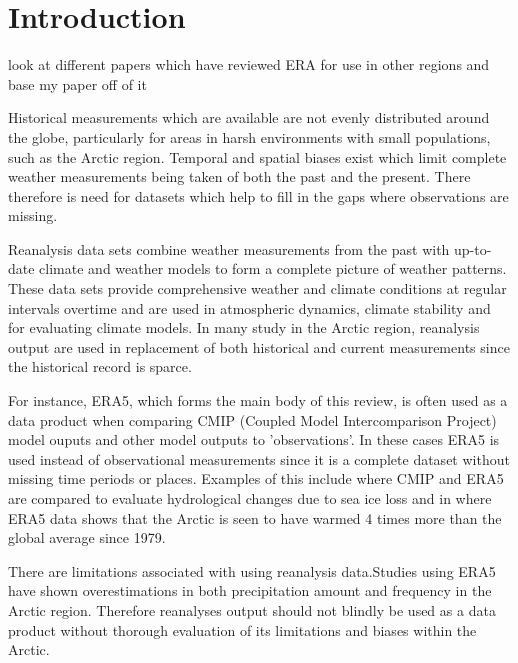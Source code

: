 \documentclass[12pt, oneside]{article}
\begin{document}
\thispagestyle{empty}
\clearpage
\setcounter{page}{1}


\pagebreak



\section{Introduction}

{\color{blue}look at different papers which have reviewed ERA for use in other regions and base my paper off of it}


Historical measurements which are available are not evenly distributed around the globe, particularly for areas in harsh environments with small populations, such as the Arctic region. Temporal and spatial biases exist which limit complete weather measurements being taken of both the past and the present. There therefore is need for datasets which help to fill in the gaps where observations are missing.

Reanalysis data sets combine weather measurements from the past with up-to-date climate and weather models to form a complete picture of weather patterns. These data sets provide comprehensive weather and climate conditions at regular intervals overtime and are used in atmospheric dynamics, climate stability and for evaluating climate models. In many study in the Arctic region, reanalysis output are used in replacement of both historical and current measurements since the historical record is sparce.

For instance, ERA5, which forms the main body of this review, is often used as a data product when comparing CMIP (Coupled Model Intercomparison Project) model ouputs and other model outputs to 'observations'. In these cases ERA5 is used instead of observational measurements since it is a complete dataset without missing time periods or places. Examples of this include \cite{ford2022arctic} where CMIP and ERA5 are compared to evaluate hydrological changes due to sea ice loss and in \cite{rantanen2022arctic} where ERA5 data shows that the Arctic is seen to have warmed 4 times more than the global average since 1979. 

There are limitations associated with using reanalysis data.Studies using ERA5 have shown overestimations in both precipitation amount and frequency in the Arctic region.
 Therefore reanalyses output should not blindly be used as a data product without thorough evaluation of its limitations and biases within the Arctic. 
\end{document}
